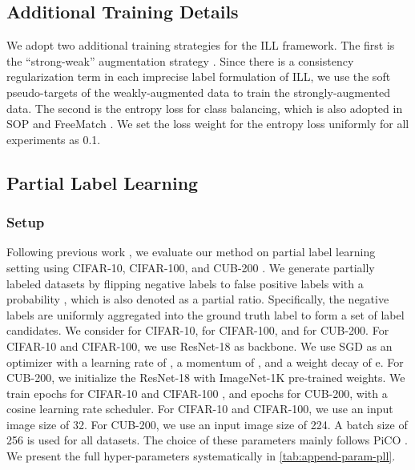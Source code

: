 \subsection{Additional Training Details}

We adopt two additional training strategies for the ILL framework. The first is the ``strong-weak'' augmentation strategy \citep{xie2020unsupervised}. Since there is a consistency regularization term in each imprecise label formulation of ILL, we use the soft pseudo-targets of the weakly-augmented data to train the strongly-augmented data. The second is the entropy loss \citep{bridle1991unsup} for class balancing, which is also adopted in SOP \citep{sopliu22w} and FreeMatch \citep{wang2023freematch}. We set the loss weight for the entropy loss uniformly for all experiments as 0.1. 






\subsection{Partial Label Learning}
\label{sec:append-exp-ppl}

\subsubsection{Setup}
Following previous work \citep{xu2022progressive,wen2021leveraged,wang2022pico}, we evaluate our method on partial label learning setting using CIFAR-10, CIFAR-100, and CUB-200 \citep{welinder2010caltech}.
We generate partially labeled datasets by flipping negative labels to false positive labels with a probability , which is also denoted as a partial ratio. 
Specifically, the  negative labels are uniformly aggregated into the ground truth label to form a set of label candidates. 
We consider  for CIFAR-10,  for CIFAR-100, and  for CUB-200. 
For CIFAR-10 and CIFAR-100, we use ResNet-18 \citep{he2016deep} as backbone. We use SGD as an optimizer with a learning rate of , a momentum of , and a weight decay of e. 
For CUB-200, we initialize the ResNet-18 \citep{he2016deep} with ImageNet-1K \citep{deng2009imagenet} pre-trained weights. 
We train  epochs for CIFAR-10 and CIFAR-100 \citep{krizhevsky2009learning}, and  epochs for CUB-200, with a cosine learning rate scheduler.
For CIFAR-10 and CIFAR-100, we use an input image size of 32. For CUB-200, we use an input image size of 224. 
A batch size of 256 is used for all datasets. 
The choice of these parameters mainly follows PiCO \citep{wang2022pico}.
We present the full hyper-parameters systematically in \cref{tab:append-param-pll}.


